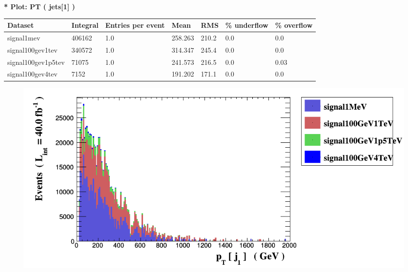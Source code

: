 \documentclass[a4paper, 10pt]{article}
\begin{document}
\textbf{* Plot: PT ( jets[1] ) }\\
   \begin{table}[H]
  \begin{center}
    \begin{tabular}{|m{23.0mm}|m{23.0mm}|m{18.0mm}|m{19.0mm}|m{19.0mm}|m{19.0mm}|m{19.0mm}|}
      \hline
      {\cellcolor{yellow}         Dataset}& {\cellcolor{yellow}         Integral}& {\cellcolor{yellow}         Entries per event}& {\cellcolor{yellow}         Mean}& {\cellcolor{yellow}         RMS}& {\cellcolor{yellow}         \% underflow}& {\cellcolor{yellow}         \% overflow}\\
      \hline
      {\cellcolor{white}         signal1mev}& {\cellcolor{white}         406162}& {\cellcolor{white}         1.0}& {\cellcolor{white}         258.263}& {\cellcolor{white}         210.2}& {\cellcolor{green}         0.0}& {\cellcolor{green}         0.0}\\
      \hline
      {\cellcolor{white}         signal100gev1tev}& {\cellcolor{white}         340572}& {\cellcolor{white}         1.0}& {\cellcolor{white}         314.347}& {\cellcolor{white}         245.4}& {\cellcolor{green}         0.0}& {\cellcolor{green}         0.0}\\
      \hline
      {\cellcolor{white}         signal100gev1p5tev}& {\cellcolor{white}         71075}& {\cellcolor{white}         1.0}& {\cellcolor{white}         241.573}& {\cellcolor{white}         216.5}& {\cellcolor{green}         0.0}& {\cellcolor{green}         0.03}\\
      \hline
      {\cellcolor{white}         signal100gev4tev}& {\cellcolor{white}         7152}& {\cellcolor{white}         1.0}& {\cellcolor{white}         191.202}& {\cellcolor{white}         171.1}& {\cellcolor{green}         0.0}& {\cellcolor{green}         0.0}\\
\hline
    \end{tabular}
  \end{center}
\end{table}

\begin{figure}[H]
  \begin{center}
    \includegraphics[scale=0.45]{selection_0.png}\\
\caption{   }
  \end{center}
\end{figure}
      \newpage
\end{document}
